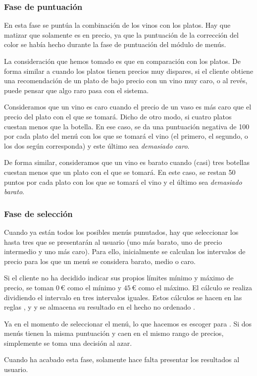 \subsubsection{Fase de puntuación}
En esta fase se puntúa la combinación de los vinos con los platos. Hay que
matizar que solamente es en precio, ya que la puntuación de la corrección del
color se había hecho durante la fase de puntuación del módulo de menús.

La consideración que hemos tomado es que  en comparación con los platos. De forma
similar a cuando los platos tienen precios muy dispares, si el cliente obtiene
una recomendación de un plato de bajo precio con un vino muy caro, o al revés,
puede pensar que algo raro pasa con el sistema.

Consideramos que un vino es caro cuando el precio de un vaso es más caro que el
precio del plato con el que se tomará. Dicho de otro modo, si cuatro platos
cuestan menos que la botella. En ese caso, se da una puntuación negativa de 100
por cada plato del menú con los que se tomará el vino (el primero, el segundo,
o los dos según corresponda) y este último sea \emph{demasiado caro}.

De forma similar, consideramos que un vino es barato cuando (casi) tres
botellas cuestan menos que un plato con el que se tomará. En este caso, se
restan 50 puntos por cada plato con los que se tomará el vino y el último sea
\emph{demasiado barato}.

\subsubsection{Fase de selección}
Cuando ya están todos los posibles menús punutados, hay que seleccionar los
hasta tres que se presentarán al usuario (uno más barato, uno de precio
intermedio y uno más caro). Para ello, inicialmente se calculan los intervalos
de precio para los que un menú se considera barato, medio o caro.

Si el cliente no ha decidido indicar sus propios límites mínimo y máximo de
precio, se toman $0\,€$ como el mínimo y $45\,€$ como el máximo. El cálculo se
realiza dividiendo el intervalo en tres intervalos iguales. Estos cálculos se
hacen en las reglas ,
 y  y se
almacena su resultado en el hecho no ordenado .

Ya en el momento de seleccionar el menú, lo que hacemos es escoger  para . Si dos
menús tienen la misma puntuación y caen en el mismo rango de precios,
simplemente se toma una decisión al azar.

Cuando ha acabado esta fase, solamente hace falta presentar los resultados al
usuario.
